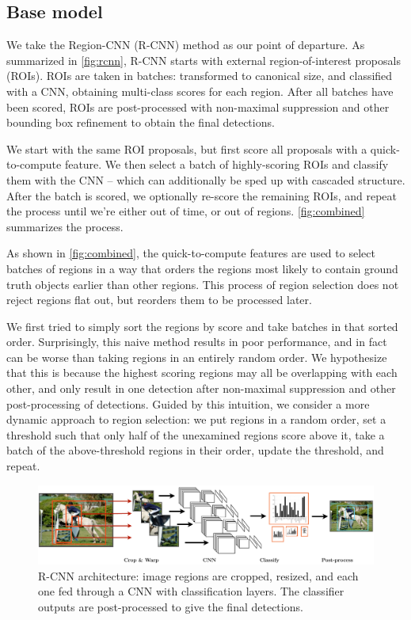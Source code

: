 \subsection{Base model}

We take the Region-CNN (R-CNN) \cite{Girshick-CVPR-2014} method as our point of departure.
As summarized in \autoref{fig:rcnn}, R-CNN starts with external region-of-interest proposals (ROIs).
ROIs are taken in batches: transformed to canonical size, and classified with a CNN, obtaining multi-class scores for each region.
After all batches have been scored, ROIs are post-processed with non-maximal suppression and other bounding box refinement to obtain the final detections.

We start with the same ROI proposals, but first score all proposals with a quick-to-compute feature.
We then select a batch of highly-scoring ROIs and classify them with the CNN -- which can additionally be sped up with cascaded structure.
After the batch is scored, we optionally re-score the remaining ROIs, and repeat the process until we're either out of time, or out of regions.
\autoref{fig:combined} summarizes the process.

As shown in \autoref{fig:combined}, the quick-to-compute features are used to select batches of regions in a way that orders the regions most likely to contain ground truth objects earlier than other regions.
This process of region selection does not reject regions flat out, but reorders them to be processed later.

We first tried to simply sort the regions by score and take batches in that sorted order.
Surprisingly, this naive method results in poor performance, and in fact can be worse than taking regions in an entirely random order.
We hypothesize that this is because the highest scoring regions may all be overlapping with each other, and only result in one detection after non-maximal suppression and other post-processing of detections.
Guided by this intuition, we consider a more dynamic approach to region selection:
we put regions in a random order, set a threshold such that only half of the unexamined regions score above it, take a batch of the above-threshold regions in their order, update the threshold, and repeat.

\begin{figure}[h!]
\begin{center}
\includegraphics[width=0.98\columnwidth]{figures/rcnn.pdf}
\caption{
R-CNN architecture: image regions are cropped, resized, and each one fed through a CNN with classification layers.
The classifier outputs are post-processed to give the final detections.
}\label{fig:rcnn}
\end{center}
\end{figure}

